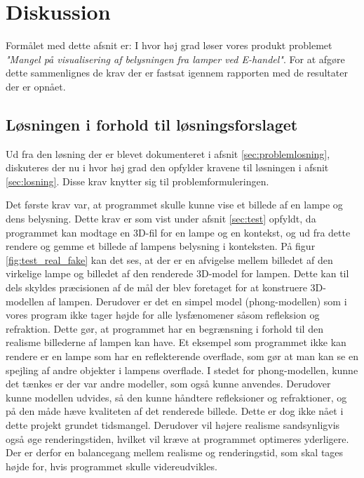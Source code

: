 \section{Diskussion}
\label{sec:diskussion}

Formålet med dette afsnit er: I hvor høj grad løser vores produkt problemet \textit{"Mangel på visualisering af belysningen fra lamper ved E-handel"}. For at afgøre dette sammenlignes de krav der er fastsat igennem rapporten med de resultater der er opnået. 

\subsection{Løsningen i forhold til løsningsforslaget}

Ud fra den løsning der er blevet dokumenteret i afsnit \ref{sec:problemlosning}, diskuteres der nu i hvor høj grad den opfylder kravene til løsningen i afsnit \ref{sec:losning}. Disse krav knytter sig til problemformuleringen.

Det første krav var, at programmet skulle kunne vise et billede af en lampe og dens belysning. Dette krav er som vist under afsnit \ref{sec:test} opfyldt, da programmet kan modtage en 3D-fil for en lampe og en kontekst, og ud fra dette rendere og gemme et billede af lampens belysning i konteksten. På figur \ref{fig:test_real_fake} kan det ses, at der er en afvigelse mellem billedet af den virkelige lampe og billedet af den renderede 3D-model for lampen. Dette kan til dels skyldes præcisionen af de mål der blev foretaget for at konstruere 3D-modellen af lampen. Derudover er det en simpel model (phong-modellen) som i vores program ikke tager højde for alle lysfænomener såsom refleksion og refraktion. Dette gør, at programmet har en begrænsning i forhold til den realisme billederne af lampen kan have. Et eksempel som programmet ikke kan rendere er en lampe som har en reflekterende overflade, som gør at man kan se en spejling af andre objekter i lampens overflade. I stedet for phong-modellen, kunne det tænkes er der var andre modeller, som også kunne anvendes. Derudover kunne modellen udvides, så den kunne håndtere refleksioner og refraktioner, og på den måde hæve kvaliteten af det renderede billede. Dette er dog ikke nået i dette projekt grundet tidsmangel. Derudover vil højere realisme sandsynligvis også øge renderingstiden, hvilket vil kræve at programmet optimeres yderligere. Der er derfor en balancegang mellem realisme og renderingstid, som skal tages højde for, hvis programmet skulle videreudvikles.

